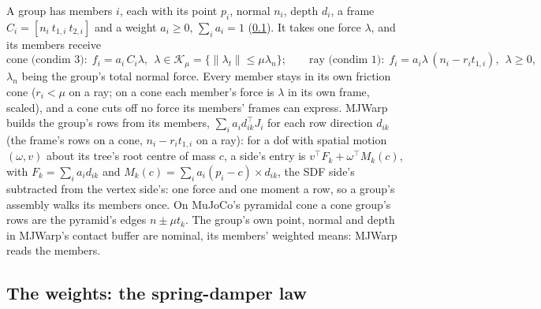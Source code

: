 A group has members $i$, each with its point $p_i$, normal $n_i$, depth $d_i$, a frame $C_i = [n_i\ t_{1,i}\ t_{2,i}]$ and a weight $a_i \ge 0$, $\sum_i a_i = 1$ (\cref{sec:basis}). It takes one force $\lambda$, and its members receive
\begin{equation}\label{eq:group}
\text{cone (condim 3):}\ \ f_i = a_i\, C_i \lambda,\ \ \lambda \in \mathcal K_\mu = \{\lVert\lambda_t\rVert \le \mu\lambda_n\}; \qquad
\text{ray (condim 1):}\ \ f_i = a_i \lambda\,(n_i - r_i t_{1,i}),\ \ \lambda \ge 0,
\end{equation}
$\lambda_n$ being the group's total normal force. Every member stays in its own friction cone ($r_i < \mu$ on a ray; on a cone each member's force is $\lambda$ in its own frame, scaled), and a cone cuts off no force its members' frames can express. MJWarp builds the group's rows from its members, $\sum_i a_i d_{ik}^\top J_i$ for each row direction $d_{ik}$ (the frame's rows on a cone, $n_i - r_i t_{1,i}$ on a ray): for a dof with spatial motion $(\omega, v)$ about its tree's root centre of mass $c$, a side's entry is $v^\top F_k + \omega^\top M_k(c)$, with $F_k = \sum_i a_i d_{ik}$ and $M_k(c) = \sum_i a_i (p_i - c) \times d_{ik}$, the SDF side's subtracted from the vertex side's: one force and one moment a row, so a group's assembly walks its members once. On MuJoCo's pyramidal cone a cone group's rows are the pyramid's edges $n \pm \mu t_k$. The group's own point, normal and depth in MJWarp's contact buffer are nominal, its members' weighted means: MJWarp reads the members.

\subsection{The weights: the spring-damper law}\label{sec:basis}

